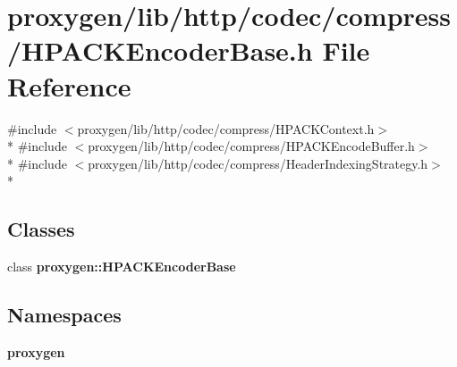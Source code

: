 \section{proxygen/lib/http/codec/compress/\+H\+P\+A\+C\+K\+Encoder\+Base.h File Reference}
\label{HPACKEncoderBase_8h}
{\ttfamily \#include $<$proxygen/lib/http/codec/compress/\+H\+P\+A\+C\+K\+Context.\+h$>$}\\*
{\ttfamily \#include $<$proxygen/lib/http/codec/compress/\+H\+P\+A\+C\+K\+Encode\+Buffer.\+h$>$}\\*
{\ttfamily \#include $<$proxygen/lib/http/codec/compress/\+Header\+Indexing\+Strategy.\+h$>$}\\*
\subsection*{Classes}
\begin{DoxyCompactItemize}
\item 
class {\bf proxygen\+::\+H\+P\+A\+C\+K\+Encoder\+Base}
\end{DoxyCompactItemize}
\subsection*{Namespaces}
\begin{DoxyCompactItemize}
\item 
 {\bf proxygen}
\end{DoxyCompactItemize}
